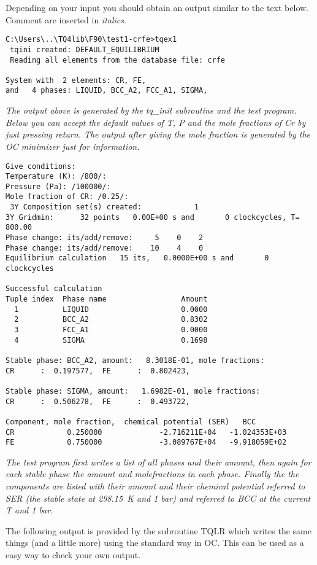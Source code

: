 \documentclass[12pt]{article}
\begin{document}
Depending on your input you should obtain an output similar to the
text below.  Comment are inserted in {\em italics}.

{\small
\begin{verbatim}
C:\Users\..\TQ4lib\F90\test1-crfe>tqex1
 tqini created: DEFAULT_EQUILIBRIUM
 Reading all elements from the database file: crfe

System with  2 elements: CR, FE,
and   4 phases: LIQUID, BCC_A2, FCC_A1, SIGMA,

\end{verbatim}
}

{\em The output above is generated by the tq\_init subroutine and the
  test program.  Below you can accept the default values of T, P and
  the mole fractions of Cr by just pressing return.  The output after
  giving the mole fraction is generated by the OC minimizer just for
  information.}

{\small
\begin{verbatim}
Give conditions:
Temperature (K): /800/:
Pressure (Pa): /100000/:
Mole fraction of CR: /0.25/:
 3Y Composition set(s) created:            1
3Y Gridmin:      32 points   0.00E+00 s and       0 clockcycles, T=  800.00
Phase change: its/add/remove:     5    0    2
Phase change: its/add/remove:    10    4    0
Equilibrium calculation   15 its,   0.0000E+00 s and       0 clockcycles

Successful calculation
Tuple index  Phase name                 Amount
  1          LIQUID                     0.0000
  2          BCC_A2                     0.8302
  3          FCC_A1                     0.0000
  4          SIGMA                      0.1698

Stable phase: BCC_A2, amount:   8.3018E-01, mole fractions:
CR      :  0.197577,  FE      :  0.802423,

Stable phase: SIGMA, amount:   1.6982E-01, mole fractions:
CR      :  0.506278,  FE      :  0.493722,

Component, mole fraction,  chemical potential (SER)   BCC
CR            0.250000             -2.716211E+04   -1.024353E+03
FE            0.750000             -3.089767E+04   -9.918059E+02

\end{verbatim}
}

{\em The test program first writes a list of all phases and their
  amount, then again for each stable phase the amount and
  molefractions in each phase.  Finally the the components are listed
  with their amount and their chemical potential referred to SER (the
  stable state at 298.15~K and 1 bar) and referred to BCC at the
  current T and 1 bar.

  The following output is provided by the subroutine TQLR which writes
  the same things (and a little more) using the standard way in OC.
  This can be used as a easy way to check your own output.}
\end{document}
